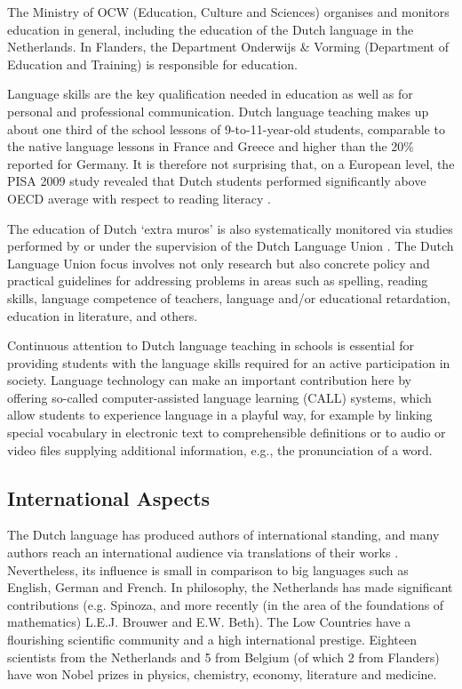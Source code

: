 \documentclass[]{../../metanetpaper}
\begin{document}
\begin{multicols}{2}
The Ministry of OCW (Education, Culture and Sciences) organises and monitors education in general, including the education of the Dutch language in the Netherlands. In Flanders, the Department Onderwijs \& Vorming (Department of Education and Training) is responsible for education.

Language skills are the key qualification needed in education as well as for personal and professional communication. Dutch language teaching makes up about one third of the school lessons of 9-to-11-year-old students, comparable to the native language lessons in France and Greece and higher than the 20\% reported for Germany.  It is therefore not surprising that, on a European level, the PISA 2009 study revealed that Dutch students performed significantly above OECD average with respect to reading literacy \cite{Dataoecd}.

The education of Dutch `extra muros' is also systematically monitored via studies performed by or under the supervision of the Dutch Language Union \cite{NTUOnderwijs}.  The Dutch Language Union focus involves not only research but also concrete policy and practical guidelines for addressing problems in areas such as spelling, reading skills, language competence of teachers, language and/or educational retardation, education in literature, and others.


Continuous attention to Dutch language teaching in schools is essential for providing students with the language skills required for an active participation in society. Language technology can make an important contribution here by offering so-called computer-assisted language learning (CALL) systems, which allow students to experience language in a playful way, for example by linking special vocabulary in electronic text to comprehensible definitions or to audio or video files supplying additional information, e.g., the pronunciation of a word.

\subsection{International Aspects}

    The Dutch language has produced authors of international standing, and many authors reach an international audience via translations of their works \cite{Vertalingendb}.   Nevertheless, its influence is small in comparison to big languages such as English, German and French. In philosophy, the Netherlands has made significant contributions (e.g. Spinoza, and more recently (in the area of the foundations of mathematics) L.E.J. Brouwer and E.W. Beth). The Low Countries have a flourishing scientific community and a high international prestige.  Eighteen scientists from the Netherlands and 5 from Belgium (of which 2 from Flanders) have won Nobel prizes in physics, chemistry, economy, literature and medicine.


\end{multicols}
\end{document}
